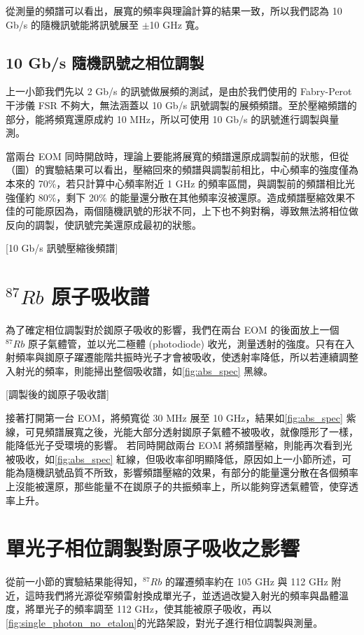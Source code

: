 \documentclass[class=NCU_thesis, crop=false]{standalone}
\begin{document}
從測量的頻譜可以看出，展寬的頻率與理論計算的結果一致，所以我們認為 10 Gb/s 的隨機訊號能將訊號展至 $\pm$10 GHz 寬。

\subsection{10 Gb/s 隨機訊號之相位調製}

上一小節我們先以 2 Gb/s 的訊號做展頻的測試，是由於我們使用的 Fabry-Perot 干涉儀 FSR 不夠大，無法涵蓋以 10 Gb/s 訊號調製的展頻頻譜。至於壓縮頻譜的部分，能將頻寬還原成約 10 MHz，所以可使用 10 Gb/s 的訊號進行調製與量測。

當兩台 EOM 同時開啟時，理論上要能將展寬的頻譜還原成調製前的狀態，但從（圖）的實驗結果可以看出，壓縮回來的頻譜與調製前相比，中心頻率的強度僅為本來的 70\%，若只計算中心頻率附近 1 GHz 的頻率區間，與調製前的頻譜相比光強僅約 80\%，剩下 20\% 的能量還分散在其他頻率沒被還原。造成頻譜壓縮效果不佳的可能原因為，兩個隨機訊號的形狀不同，上下也不夠對稱，導致無法將相位做反向的調製，使訊號完美還原成最初的狀態。

[10 Gb/s 訊號壓縮後頻譜]

\section{$^{87}Rb$ 原子吸收譜}

為了確定相位調製對於銣原子吸收的影響，我們在兩台 EOM 的後面放上一個 $^{87}Rb$ 原子氣體管，並以光二極體 (photodiode) 收光，測量透射的強度。只有在入射頻率與銣原子躍遷能階共振時光子才會被吸收，使透射率降低，所以若連續調整入射光的頻率，則能掃出整個吸收譜，如\cref{fig:abs_spec} 黑線。

[調製後的銣原子吸收譜]

接著打開第一台 EOM，將頻寬從 30 MHz 展至 10 GHz，結果如\cref{fig:abs_spec} 紫線，可見頻譜展寬之後，光能大部分透射銣原子氣體不被吸收，就像隱形了一樣，能降低光子受環境的影響。
若同時開啟兩台 EOM 將頻譜壓縮，則能再次看到光被吸收，如\cref{fig:abs_spec} 紅線，但吸收率卻明顯降低，原因如上一小節所述，可能為隨機訊號品質不所致，影響頻譜壓縮的效果，有部分的能量還分散在各個頻率上沒能被還原，那些能量不在銣原子的共振頻率上，所以能夠穿透氣體管，使穿透率上升。

\section{單光子相位調製對原子吸收之影響}
從前一小節的實驗結果能得知，$^{87}Rb$ 的躍遷頻率約在 105 GHz 與 112 GHz 附近，這時我們將光源從窄頻雷射換成單光子，並透過改變入射光的頻率與晶體溫度，將單光子的頻率調至 112 GHz，使其能被原子吸收，再以\cref{fig:single_photon_no_etalon}的光路架設，對光子進行相位調製與測量。
\end{document}
